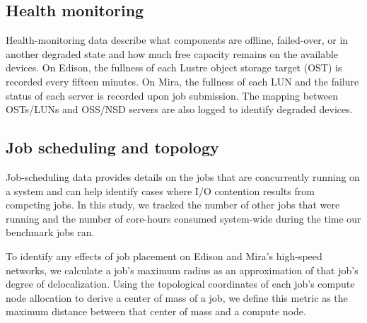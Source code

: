 \subsection{Health monitoring} \label{sec:methods/health}

Health-monitoring data describe what components are offline, failed-over, or in another degraded state and how much free capacity remains on the available devices.
On Edison, the fullness of each Lustre object storage target (OST) is recorded every fifteen minutes.  
On Mira, the fullness of each LUN and the failure status of each server is recorded upon job submission.
The mapping between OSTs/LUNs and OSS/NSD servers are also logged to identify degraded devices.

\subsection{Job scheduling and topology} \label{sec:methods/scheduling}

Job-scheduling data provides details on the jobs that are concurrently running on a system and can help identify cases where I/O contention results from competing jobs.
In this study, we tracked the number of other jobs that were running and the number of core-hours consumed system-wide during the time our benchmark jobs ran.

To identify any effects of job placement on Edison and Mira's high-speed networks, we calculate a job's maximum radius as an approximation of that job's degree of delocalization.
Using the topological coordinates of each job's compute node allocation to derive a center of mass of a job, we define this metric as the maximum distance between that center of mass and a compute node.

